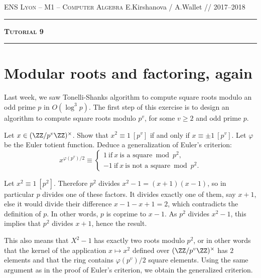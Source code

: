 \documentclass[11pt]{exam}
\theoremstyle{definition}
\begin{document}
{\noindent
   \textsc{ENS Lyon --  M1 -- Computer Algebra}
   \hfill {E.Kirshanova / A.Wallet // 2017--2018\\
  }
  \hrule
  \begin{center}
    {\Large\textbf{
   \textsc{Tutorial 9}
    } } 
  \end{center}
  \hrule \vspace{5mm}

\thispagestyle{empty}

\vspace{0.2cm}



\section{Modular roots and factoring, again}

Last week, we saw Tonelli-Shanks algorithm to compute square roots modulo an odd prime $p$ in $O(\log^3 p)$. The first step of this exercise is to design an algorithm to compute square roots modulo $p^v$, for some $v\geq 2$ and odd prime $p$.
  

\begin{questions}
  \question Let $x \in (\ZZ/p^v\ZZ)^\times$. Show that $x^2 \equiv 1~[p^v]$ if and only if $x \equiv \pm 1~[p^v]$. Let $\varphi$ be the Euler totient function. Deduce a generalization of Euler's criterion:
  $$x^{\varphi(p^v)/2} \equiv \begin{cases} 1~\text{if}~x~\text{is a square}\bmod p^2,\\
    -1~\text{if}~x~\text{is not a square}\bmod p^2.\end{cases}$$
  \begin{solution}
    Let $x^2 \equiv 1~[p^2]$. Therefore $p^2$ divides $x^2-1=(x+1)(x-1)$, so in particular $p$ divides one of these factors. It divides exactly one of them, say $x+1$, else it would divide their difference $x-1 -x +1=2$, which contradicts the definition of $p$. In other words, $p$ is coprime to $x-1$. As $p^2$ divides $x^2-1$, this implies that $p^2$ divides $x+1$, hence the result.

    This also means that $X^2-1$ has exactly two roots modulo $p^2$, or in other words that the kernel of the application $x\mapsto x^2$ defined over $(\ZZ/p^v\ZZ)^\times$ has $2$ elements and that the ring contains $\varphi(p^v)/2$ square elements. Using the same argument as in the proof of Euler's criterion, we obtain the generalized criterion.
  \end{solution}


\end{questions}}
\end{document}
